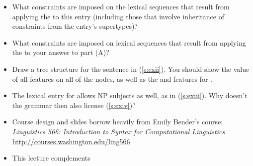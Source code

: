 \documentclass[a4paper,landscape,headrule,footrule]{foils}
\begin{document}
\newpage
\begin{itemize}
\item[A.] What constraints are imposed on the lexical sequences that
  result from applying the  to
  this entry (including those that involve inheritance of constraints
  from the entry's supertypes)?

\item[B.] What constraints are imposed on lexical sequences that
  result from applying the  to your
  answer to part (A)?

\item[C.] Draw a tree structure for the sentence in (\ref{s:exii}).
  You should show the value of all  features on all of the nodes,
  as well as the  and  features for .

\begin{exe}
  \ex\label{s:exii} 
\end{exe}
\newpage
\item[D.] The lexical entry for  allows NP subjects as
  well, as in (\ref{s:exiii}).  Why doesn't the grammar then also
  license (\ref{s:exiv})?

\begin{exe}
\ex\label{s:exiii} 

\ex\label{s:exiv} 
\end{exe}
\end{itemize}




\begin{itemize}
\item Course design and slides borrow heavily from Emily Bender's course:
\textit{Linguistics 566: Introduction to Syntax for Computational Linguistics}
\\ \url{http://courses.washington.edu/ling566}
\item This lecture complements \citet[Chapter 11]{sag:wasow:bender:2003}
\end{itemize}


\end{document}
